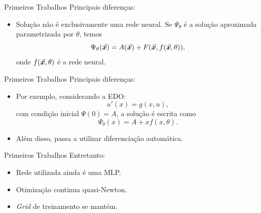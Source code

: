 \documentclass[13pt]{beamer}
\begin{document}
\begin{frame}{Primeiros Trabalhos}
    Principais diferenças:
    \begin{itemize}
        \item<1-> Solução não é exclusivamente uma rede neural.
            Se \( \Psi_{ \theta } \) é a solução aproximada parametrizada por \( \theta \), temos
            \begin{equation*}
                \Psi_{ \theta } ( \vec{\bm{x}} ) = A ( \vec{\bm{x}} ) + F ( \vec{\bm{x}}, f ( \vec{\bm{x}}, \theta ) )
            ,\end{equation*}
            onde \( f ( \vec{\bm{x}}, \theta ) \) é a rede neural.

    \end{itemize}
\end{frame}

\begin{frame}{Primeiros Trabalhos}
    Principais diferenças:
    \begin{itemize}
        \item<1-> Por exemplo, considerando a EDO:
            \begin{equation*}
                u' ( x ) = g ( x, u )
            ,\end{equation*}
            com condição inicial \( \Psi ( 0 ) = A \), a solução é escrita como
            \begin{equation*}
                \Psi_{ \theta } ( x ) = A + x f ( x, \theta )
            .\end{equation*}
        \item<2-> Além disso, passa a utilizar diferenciação automática.
    \end{itemize}
\end{frame}

\begin{frame}{Primeiros Trabalhos}
    Entretanto:
    \begin{itemize}
        \item<1-> Rede utilizada ainda é uma MLP.
        \item<2-> Otimização continua quasi-Newton.
        \item<3-> \emph{Grid} de treinamento se mantém.
    \end{itemize}
\end{frame}
\end{document}
